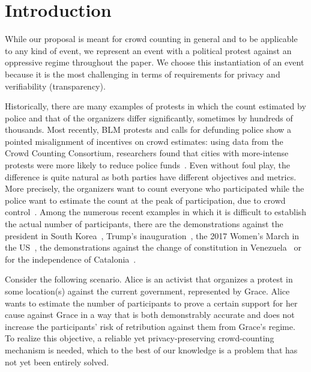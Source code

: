 \section{Introduction}%
\label{Introduction}


While our proposal is meant for crowd counting in general and to be applicable to any kind of event, we represent an event with a political protest against an oppressive regime throughout the paper. We choose this instantiation of an event because it is the most challenging in terms of requirements for privacy and verifiability (transparency).

Historically, there are many examples of protests in which the count estimated by police and that of the organizers differ significantly, sometimes by hundreds of thousands. Most recently, BLM protests and calls for defunding police show a pointed misalignment of incentives on crowd estimates: using data from the Crowd Counting Consortium, researchers found that cities with more-intense protests were more likely to reduce police funds~\cite{WP2021}.
Even without foul play, the difference is quite natural as both parties have different objectives and metrics.
More precisely, the organizers want to count everyone who participated while the police want to estimate the count at the peak of participation, due to crowd control~\cite{2016DemonstrationsInSeoul}. 
Among the numerous recent examples in which it is difficult to establish the actual number of participants, there are the demonstrations against the president in South Korea~\cite{2016DemonstrationsInSeoul}, Trump's inauguration~\cite{HowWillWeKnowTrumpInauguralCrowdSize}, the 2017 Women's March in the US~\cite{2017WomensMarchesInUS}, the demonstrations against the change of constitution in Venezuela~\cite{AlJazeeraOnVenezuela2017} or for the independence of Catalonia~\cite{CataloniaDemonstrations}.

Consider the following scenario.
Alice is an activist that organizes a protest in some location(s) against the current government, represented by Grace.
Alice wants to estimate the number of participants to prove a certain support for her cause against Grace in a way that is both demonstrably accurate and does not increase the participants' risk of retribution against them from Grace's regime. 
To realize this objective, a reliable yet privacy-preserving crowd-counting mechanism is needed, which to the best of our knowledge is a problem that has not yet been entirely solved.



